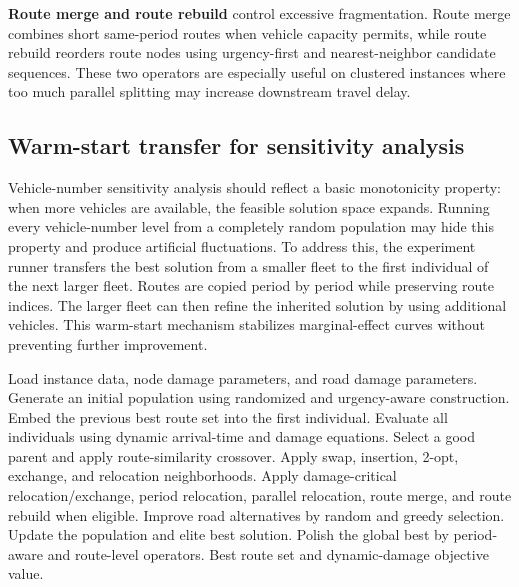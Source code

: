﻿\documentclass[preprint,12pt,authoryear]{elsarticle}
\begin{document}
\textbf{Route merge and route rebuild} control excessive fragmentation. Route merge combines short same-period routes when vehicle capacity permits, while route rebuild reorders route nodes using urgency-first and nearest-neighbor candidate sequences. These two operators are especially useful on clustered instances where too much parallel splitting may increase downstream travel delay.
\subsection{Warm-start transfer for sensitivity analysis}

Vehicle-number sensitivity analysis should reflect a basic monotonicity property: when more vehicles are available, the feasible solution space expands. Running every vehicle-number level from a completely random population may hide this property and produce artificial fluctuations. To address this, the experiment runner transfers the best solution from a smaller fleet to the first individual of the next larger fleet. Routes are copied period by period while preserving route indices. The larger fleet can then refine the inherited solution by using additional vehicles. This warm-start mechanism stabilizes marginal-effect curves without preventing further improvement.

\begin{algorithm}[H]
\caption{Improved hybrid genetic algorithm}
\label{alg:ihga}
\begin{algorithmic}[1]
\STATE Load instance data, node damage parameters, and road damage parameters.
\STATE Generate an initial population using randomized and urgency-aware construction.
    \STATE Embed the previous best route set into the first individual.
\ENDIF
\STATE Evaluate all individuals using dynamic arrival-time and damage equations.
        \STATE Select a good parent and apply route-similarity crossover.
        \STATE Apply swap, insertion, 2-opt, exchange, and relocation neighborhoods.
        \STATE Apply damage-critical relocation/exchange, period relocation, parallel relocation, route merge, and route rebuild when eligible.
        \STATE Improve road alternatives by random and greedy selection.
    \ENDFOR
    \STATE Update the population and elite best solution.
\ENDFOR
\STATE Polish the global best by period-aware and route-level operators.
\RETURN Best route set and dynamic-damage objective value.
\end{algorithmic}
\end{algorithm}
\end{document}
